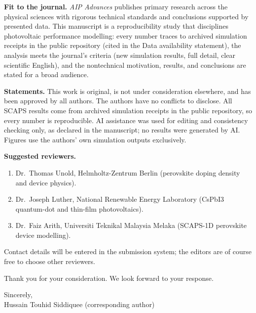 \documentclass[11pt,a4paper]{article}
\begin{document}
\textbf{Fit to the journal.} \textit{AIP Advances} publishes primary research across the physical sciences with rigorous technical standards and conclusions supported by presented data. This manuscript is a reproducibility study that disciplines photovoltaic performance modelling: every number traces to archived simulation receipts in the public repository (cited in the Data availability statement), the analysis meets the journal's criteria (new simulation results, full detail, clear scientific English), and the nontechnical motivation, results, and conclusions are stated for a broad audience.

\textbf{Statements.} This work is original, is not under consideration elsewhere, and has been approved by all authors. The authors have no conflicts to disclose. All SCAPS results come from archived simulation receipts in the public repository, so every number is reproducible. AI assistance was used for editing and consistency checking only, as declared in the manuscript; no results were generated by AI. Figures use the authors' own simulation outputs exclusively.

\textbf{Suggested reviewers.}
\begin{enumerate}
\item Dr.\ Thomas Unold, Helmholtz-Zentrum Berlin (perovskite doping density and device physics).
\item Dr.\ Joseph Luther, National Renewable Energy Laboratory (CsPbI3 quantum-dot and thin-film photovoltaics).
\item Dr.\ Faiz Arith, Universiti Teknikal Malaysia Melaka (SCAPS-1D perovskite device modelling).
\end{enumerate}
Contact details will be entered in the submission system; the editors are of course free to choose other reviewers.

Thank you for your consideration. We look forward to your response.

\vspace{2em}
\noindent Sincerely,\\
Hussain Touhid Siddiquee (corresponding author)
\end{document}
